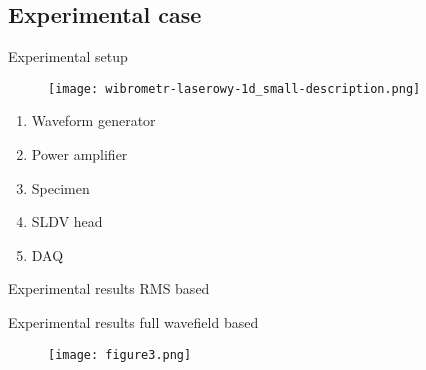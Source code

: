 \documentclass[10pt,aspectratio=169]{beamer} %
\begin{document}
\subsection{Experimental case}
\setcounter{subfigure}{0}
\begin{frame}{Experimental setup}
	\begin{minipage}[t]{0.55\textwidth}
		\begin{figure}
			\centering
			\texttt{[image: wibrometr-laserowy-1d\_small-description.png]}
		\end{figure}
	\end{minipage}
	\begin{minipage}[t]{0.4\textwidth}
		\begin{enumerate}
			\item Waveform generator
			\item Power amplifier	
			\item Specimen
			\item SLDV head
			\item DAQ
		\end{enumerate}
	\end{minipage}
\end{frame}

\begin{frame}{Experimental results RMS based}
	\centering
	\begin{figure}
		\hfill
		\qquad
	\end{figure}
\end{frame}

\setcounter{subfigure}{0}
\begin{frame}{Experimental results full wavefield based}
	\begin{minipage}[ct]{0.5\textwidth}
	\begin{figure}
		\centering
		\texttt{[image: figure3.png]}
	\end{figure}
	\end{minipage}
	\hfill
	\begin{minipage}[t]{0.4\textwidth}
		\centering
		\par\medskip{}\qquad
	\end{minipage}
\end{frame}
\end{document}
